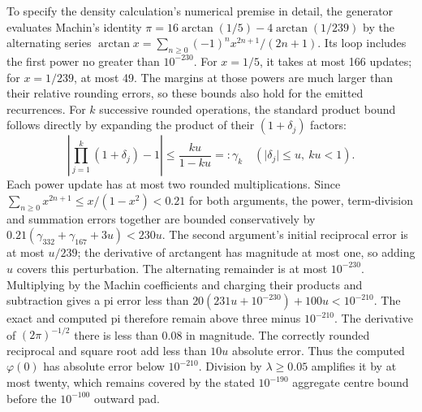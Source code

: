 To specify the density calculation's numerical premise in detail, the
generator evaluates Machin's identity
\(\pi=16\arctan(1/5)-4\arctan(1/239)\) by the alternating series
\(\arctan x=\sum_{n\geq0}(-1)^n x^{2n+1}/(2n+1)\).
Its loop includes the first power no greater than \(10^{-230}\).
For \(x=1/5\), it takes at most 166 updates; for \(x=1/239\),
at most 49. The margins at those powers are much larger than their
relative rounding errors, so these bounds also hold for the emitted
recurrences. For \(k\) successive rounded operations, the standard
product bound follows directly by expanding the product of their
\((1+\delta_j)\) factors:
\[
 \left\lvert\prod_{j=1}^k(1+\delta_j)-1\right\rvert
 \leq\frac{ku}{1-ku}=: \gamma_k\quad
 (\lvert\delta_j\rvert\leq u,\ ku<1).
\]
Each power update has at most two rounded multiplications. Since
\(\sum_{n\geq0}x^{2n+1}\leq x/(1-x^2)<0.21\) for both
arguments, the power, term-division and summation errors together are
bounded conservatively by
\(0.21(\gamma_{332}+\gamma_{167}+3u)<230u\).
The second argument's initial reciprocal error is at most \(u/239\);
the derivative of arctangent has magnitude at most one, so adding \(u\)
covers this perturbation. The alternating remainder is at most
\(10^{-230}\). Multiplying by the Machin coefficients and charging
their products and subtraction gives a pi error less than
\(20(231u+10^{-230})+100u<10^{-210}\).
The exact and computed pi therefore remain above three minus
\(10^{-210}\). The derivative of \((2\pi)^{-1/2}\) there is less
than 0.08 in magnitude. The correctly rounded reciprocal and square root
add less than \(10u\) absolute error. Thus the computed
\(\varphi(0)\) has absolute error below \(10^{-210}\).
Division by \(\lambda\geq0.05\) amplifies it by at most twenty,
which remains covered by the stated \(10^{-190}\) aggregate centre
bound before the \(10^{-100}\) outward pad.

